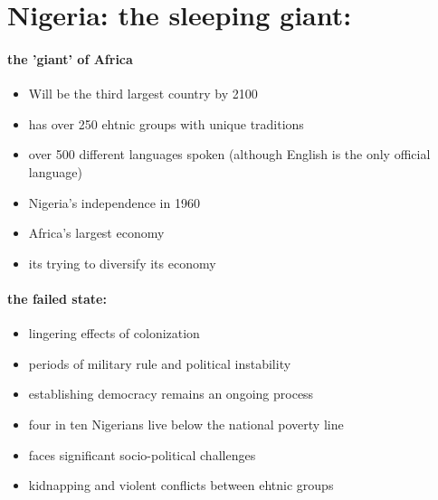 \documentclass[12pt,a4paper]{report}
\begin{document}
	\section{Nigeria: the sleeping giant:}
	\paragraph{the 'giant' of Africa}
	\begin{itemize}
		\item Will be the third largest country by 2100
		\item has over 250 ehtnic groups with unique traditions
		\item over 500 different languages spoken (although English is the only official language)
		\item Nigeria's independence in 1960
		\item Africa's largest economy
		\item its trying to diversify its economy 
	\end{itemize}
	\paragraph{the failed state:}
	\begin{itemize}
		\item lingering effects of colonization
		\item periods of military rule and political instability
		\item establishing democracy remains an ongoing process
		\item four in ten Nigerians live below the national poverty line
		\item faces significant socio-political challenges
		\item kidnapping and violent conflicts between ehtnic groups
	\end{itemize}
\end{document}
